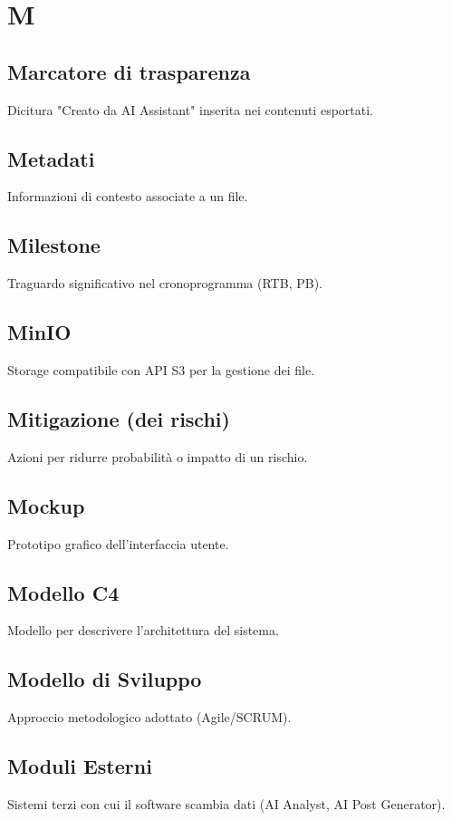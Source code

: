 \documentclass[a4paper,12pt]{article}
\begin{document}
\section{M}
\subsection{Marcatore di trasparenza}
Dicitura "Creato da AI Assistant" inserita nei contenuti esportati.

\subsection{Metadati}
Informazioni di contesto associate a un file.

\subsection{Milestone}
Traguardo significativo nel cronoprogramma (RTB, PB).

\subsection{MinIO}
Storage compatibile con API S3 per la gestione dei file.

\subsection{Mitigazione (dei rischi)}
Azioni per ridurre probabilità o impatto di un rischio.

\subsection{Mockup}
Prototipo grafico dell'interfaccia utente.

\subsection{Modello C4}
Modello per descrivere l'architettura del sistema.

\subsection{Modello di Sviluppo}
Approccio metodologico adottato (Agile/SCRUM).

\subsection{Moduli Esterni}
Sistemi terzi con cui il software scambia dati (AI Analyst, AI Post Generator).
\end{document}
